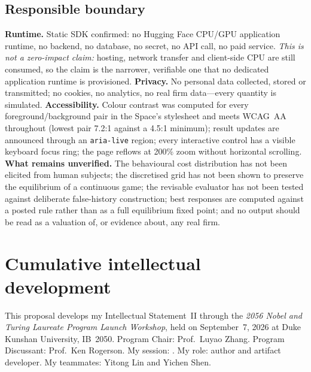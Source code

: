 \subsection{Responsible boundary}
\textbf{Runtime.} Static SDK confirmed: no Hugging Face CPU/GPU application
runtime, no backend, no database, no secret, no API call, no paid service.
\emph{This is not a zero-impact claim:} hosting, network transfer and
client-side CPU are still consumed, so the claim is the narrower, verifiable one
that no dedicated application runtime is provisioned.
\textbf{Privacy.} No personal data collected, stored or transmitted; no cookies,
no analytics, no real firm data---every quantity is simulated.
\textbf{Accessibility.} Colour contrast was computed for every
foreground/background pair in the Space's stylesheet and meets WCAG~AA
throughout (lowest pair 7.2:1 against a 4.5:1 minimum); result updates are
announced through an \texttt{aria-live} region; every interactive control has a
visible keyboard focus ring; the page reflows at 200\% zoom without horizontal
scrolling.
\textbf{What remains unverified.} The behavioural cost distribution has not been
elicited from human subjects; the discretised grid has not been shown to
preserve the equilibrium of a continuous game; the revisable evaluator has not
been tested against deliberate false-history construction; best responses are
computed against a posted rule rather than as a full equilibrium fixed point;
and no output should be read as a valuation of, or evidence about, any real firm.

\clearpage
\section{Cumulative intellectual development}
This proposal develops my Intellectual Statement~II through the \emph{2056 Nobel
and Turing Laureate Program Launch Workshop}, held on September~7, 2026 at Duke
Kunshan University, IB~2050. Program Chair: Prof.\ Luyao Zhang. Program
Discussant: Prof.\ Ken Rogerson. My session: \WorkshopSession. My role: author
and artifact developer. My teammates: Yitong Lin and Yichen Shen.

